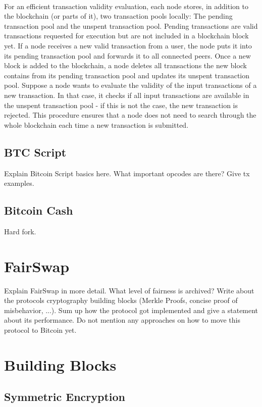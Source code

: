 \documentclass{cacthesis}
\newcounter{protocol}
\begin{document}
        \\ For an efficient transaction validity evaluation, each node stores, in addition to the blockchain (or parts of it), two transaction pools locally: The pending transaction pool and the unspent transaction pool. Pending transactions are valid transactions requested for execution but are not included in a blockchain block yet. If a node receives a new valid transaction from a user, the node puts it into its pending transaction pool and forwards it to all connected peers. Once a new block is added to the blockchain, a node deletes all transactions the new block contains from its pending transaction pool and updates its unspent transaction pool. Suppose a node wants to evaluate the validity of the input transactions of a new transaction. In that case, it checks if all input transactions are available in the unspent transaction pool - if this is not the case, the new transaction is rejected. This procedure ensures that a node does not need to search through the whole blockchain each time a new transaction is submitted. \\

        
        \subsection{BTC Script}
        Explain Bitcoin Script basics here. What important opcodes are there? Give tx examples.
        \subsection{Bitcoin Cash}
        Hard fork.
        
        \section{FairSwap}
        Explain FairSwap in more detail. What level of fairness is archived? Write about the protocols cryptography building blocks (Merkle Proofs, concise proof of misbehavior, ...). Sum up how the protocol got implemented and give a statement about its performance. Do not mention any approaches on how to move this protocol to Bitcoin yet.
        
        \section{Building Blocks}
        \subsection{Symmetric Encryption}
\end{document}
